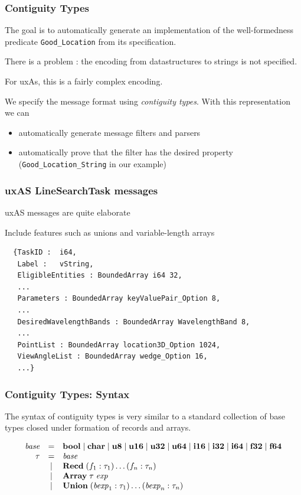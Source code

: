 \documentclass{beamer}
\newcommand{\konst}[1]{\ensuremath{\mbox{\bf{#1}}}}
\begin{document}
\begin{frame}[fragile]\frametitle{Contiguity Types}

The goal is to automatically generate an implementation of the
well-formedness predicate \verb+Good_Location+ from its specification.

There is a problem : the encoding from datastructures to strings is not specified.

For uxAs, this is a fairly complex encoding.

We specify the message format using \emph{contiguity types}. With this representation we can
\begin{itemize}
\item automatically generate message filters and parsers

\item automatically prove that the filter has the desired property
  (\verb+Good_Location_String+ in our example)
\end{itemize}

\end{frame}

\begin{frame}[fragile]\frametitle{uxAS LineSearchTask messages}

uxAS messages are quite elaborate

Include features such as unions and variable-length arrays


{\small
\begin{verbatim}
  {TaskID :  i64,
   Label :   vString,
   EligibleEntities : BoundedArray i64 32,
   ...
   Parameters : BoundedArray keyValuePair_Option 8,
   ...
   DesiredWavelengthBands : BoundedArray WavelengthBand 8,
   ...
   PointList : BoundedArray location3D_Option 1024,
   ViewAngleList : BoundedArray wedge_Option 16,
   ...}
\end{verbatim}
}

\end{frame}

\begin{frame}[fragile]\frametitle{Contiguity Types: Syntax}

The syntax of contiguity types is very similar to a standard
collection of base types closed under formation of records and arrays.

\[
\begin{array}{rcl}
 \mathit{base} & = & \konst{bool} \mid \konst{char} \mid \konst{u8} \mid
 \konst{u16} \mid \konst{u32} \mid \konst{u64}  \mid \konst{i16} \mid
 \konst{i32} \mid \konst{i64} \mid \konst{f32} \mid \konst{f64} \\
 \tau & = & \mathit{base} \\
      & \mid & \konst{Recd}\; (f_1 : \tau_1) \ldots (f_n : \tau_n) \\
      & \mid & \konst{Array}\; \tau \; \mathit{exp} \\
      & \mid & \konst{Union}\; (\mathit{bexp}_1 : \tau_1) \ldots (\mathit{bexp}_n : \tau_n)
\end{array}
\]
\end{frame}
\end{document}

